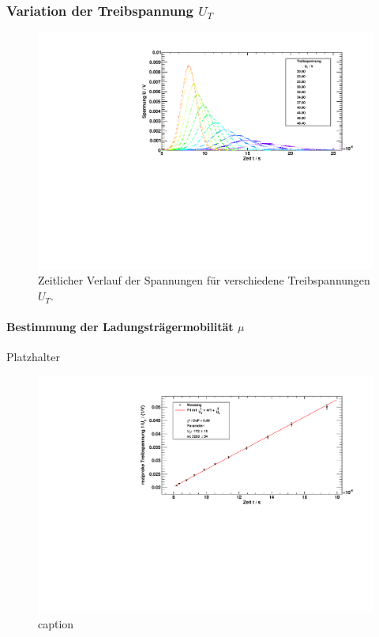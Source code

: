 \subsubsection{Variation der Treibspannung \texorpdfstring{$U_T$}{U\_T}}

\begin{figure}[H]
\begin{center}
  \includegraphics[width=\textwidth]{../img/part2/voltages.pdf}
  \caption{Zeitlicher Verlauf der Spannungen für verschiedene Treibspannungen $U_T$.}
  \label{img:volts}
\end{center}
\end{figure}

\paragraph{Bestimmung der Ladungsträgermobilität $\mu$} 
Platzhalter

\begin{figure}[H]
\begin{center}
  \includegraphics[width=\textwidth]{../img/part2/volt_fitXc.pdf}
  \caption{caption}
  \label{img:volt:fitxc}
\end{center}
\end{figure}

